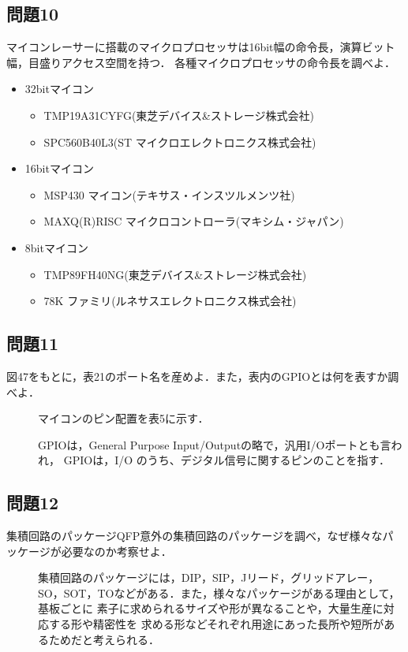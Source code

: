 \subsection*{問題10}
マイコンレーサーに搭載のマイクロプロセッサは16bit幅の命令長，演算ビット幅，目盛りアクセス空間を持つ．
各種マイクロプロセッサの命令長を調べよ．
\begin{itemize}
    \item 32bitマイコン
    \begin{itemize}
        \item TMP19A31CYFG(東芝デバイス\&ストレージ株式会社)
        \item SPC560B40L3(ST マイクロエレクトロニクス株式会社)
    \end{itemize}
    \item 16bitマイコン
    \begin{itemize}
        \item MSP430 マイコン(テキサス・インスツルメンツ社)
        \item MAXQ(R)RISC マイクロコントローラ(マキシム・ジャパン)
    \end{itemize}
    \item 8bitマイコン
    \begin{itemize}
        \item TMP89FH40NG(東芝デバイス\&ストレージ株式会社)
        \item 78K ファミリ(ルネサスエレクトロニクス株式会社)
    \end{itemize}
\end{itemize}

\subsection*{問題11}
図47をもとに，表21のポート名を産めよ．また，表内のGPIOとは何を表すか調べよ．
\begin{description}
    \item[] マイコンのピン配置を表5に示す．
    \item[] GPIOは，General Purpose Input/Outputの略で，汎用I/Oポートとも言われ，
    GPIOは，I/O のうち、デジタル信号に関するピンのことを指す．
\end{description}


\subsection*{問題12}
集積回路のパッケージQFP意外の集積回路のパッケージを調べ，なぜ様々なパッケージが必要なのか考察せよ．
\begin{description}
    \item[] 集積回路のパッケージには，DIP，SIP，Jリード，グリッドアレー，
    SO，SOT，TOなどがある．また，様々なパッケージがある理由として，基板ごとに
    素子に求められるサイズや形が異なることや，大量生産に対応する形や精密性を
    求める形などそれぞれ用途にあった長所や短所があるためだと考えられる．
\end{description}

